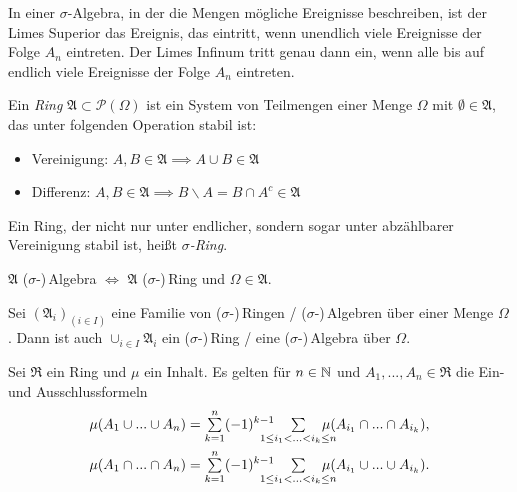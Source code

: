 \documentclass{cheat-sheet}
\newcommand{\Ring}{\mathfrak{R}} %
\begin{document}
\begin{bem}
  In einer $\sigma$-Algebra, in der die Mengen mögliche Ereignisse beschreiben, ist der Limes Superior das Ereignis, das eintritt, wenn unendlich viele Ereignisse der Folge $A_n$ eintreten. Der Limes Infinum tritt genau dann ein, wenn alle bis auf endlich viele Ereignisse der Folge $A_n$ eintreten.
\end{bem}

\begin{defn}
  Ein \emph{Ring} $\mathfrak{A} \subset \mathcal{P}(\Omega)$ ist ein System von Teilmengen einer Menge $\Omega$ mit $\emptyset \in \mathfrak{A}$, das unter folgenden Operation stabil ist:

  \begin{itemize}
    \item Vereinigung: $A, B \in \mathfrak{A} \implies A \cup B \in \mathfrak{A}$
    \item Differenz: $A, B \in \mathfrak{A} \implies B \backslash A = B \cap A^c \in \mathfrak{A}$
  \end{itemize}

  Ein Ring, der nicht nur unter endlicher, sondern sogar unter abzählbarer Vereinigung stabil ist, heißt \emph{$\sigma$-Ring}.
\end{defn}

\begin{bem}
  $\mathfrak{A}$ ($\sigma$-)\,Algebra $\iff$ $\mathfrak{A}$ ($\sigma$-)\,Ring und $\Omega \in \mathfrak{A}$.
\end{bem}

\begin{satz}
  Sei $(\mathfrak{A}_i)_{(i \in I)}$ eine Familie von ($\sigma$-)\,Ringen / ($\sigma$-)\,Algebren über einer Menge $\Omega$. Dann ist auch $\cup_{i \in I} \mathfrak{A}_i$ ein ($\sigma$-)\,Ring / eine ($\sigma$-)\,Algebra über $\Omega$.
\end{satz}


\begin{satz}
  Sei $\Ring$ ein Ring und $\mu$ ein Inhalt. Es gelten für $n \in \mathbb{N}$ und $A_1, ..., A_n \in \Ring$ die Ein- und Ausschlussformeln
  \begin{align*}
    \mu(A_1 \cup ... \cup A_n) &= \sum_{k=1}^n (-1)^{k-1} \quad \sum_{\mathclap{1 \leq i_1 < ... < i_k \leq n}} \quad \mu(A_{i_1} \cap ... \cap A_{i_k}), \\
    \mu(A_1 \cap ... \cap A_n) &= \sum_{k=1}^n (-1)^{k-1} \quad \sum_{\mathclap{1 \leq i_1 < ... < i_k \leq n}} \quad \mu(A_{i_1} \cup ... \cup A_{i_k}).
  \end{align*}
\end{satz}
\end{document}

